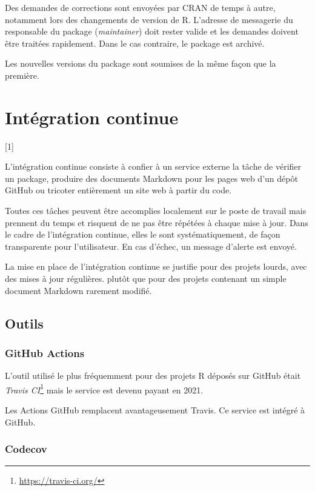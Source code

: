 \documentclass[
  12pt,
  french,
  a4paper,
  extrafontsizes,onecolumn,openright
  ]{memoir}
\newcommand{\toc}[1]{%
  \startcontents[chapters]%
  \printcontents[chapters]{}{1}[#1]{}%
  ~\newline%
}
\begin{document}
Des demandes de corrections sont envoyées par CRAN de temps à autre, notamment lors des changements de version de R.
L'adresse de messagerie du responsable du package (\emph{maintainer}) doit rester valide et les demandes doivent être traitées rapidement.
Dans le cas contraire, le package est archivé.

Les nouvelles versions du package sont soumises de la même façon que la première.

\chapter{Intégration continue}\label{chap-ci}

\toc{1}

L'intégration continue consiste à confier à un service externe la tâche de vérifier un package, produire des documents Markdown pour les pages web d'un dépôt GitHub ou tricoter entièrement un site web à partir du code.

Toutes ces tâches peuvent être accomplies localement sur le poste de travail mais prennent du temps et risquent de ne pas être répétées à chaque mise à jour.
Dans le cadre de l'intégration continue, elles le sont systématiquement, de façon transparente pour l'utilisateur.
En cas d'échec, un message d'alerte est envoyé.

La mise en place de l'intégration continue se justifie pour des projets lourds, avec des mises à jour régulières.
plutôt que pour des projets contenant un simple document Markdown rarement modifié.

\section{Outils}\label{outils}

\subsection{GitHub Actions}\label{github-actions}

L'outil utilisé le plus fréquemment pour des projets R déposés sur GitHub était \emph{Travis CI}\footnote{\url{https://travis-ci.org/}} mais le service est devenu payant en 2021.

Les Actions GitHub remplacent avantageusement Travis.
Ce service est intégré à GitHub.

\subsection{Codecov}\label{codecov}
\end{document}
